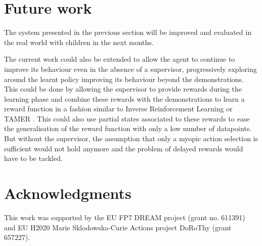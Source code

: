\documentclass[letterpaper]{article} %
\begin{document}
\section{Future work}

The system presented in the previous section will be improved and
evaluated in the real world with children in the next months.

The current work could also be extended to allow the agent to continue to
    improve its behaviour even in the absence of a supervisor, progressively
    exploring around the learnt policy improving its behaviour beyond the
    demonstrations. This could be done by allowing the supervisor to provide
    rewards during the learning phase and combine these rewards with the
    demonstrations to learn a reward function in a fashion similar to Inverse
    Reinforcement Learning \cite{abbeel2004apprenticeship} or TAMER
    \cite{knox2009interactively}. This could also use partial states associated
    to these rewards to ease the generalisation of the reward function with only
    a low number of datapoints.  But without the supervisor, the assumption that
    only a myopic action selection is sufficient would not hold anymore and the
    problem of delayed rewards would have to be tackled.
\section{Acknowledgments} This work was supported by the EU FP7 DREAM project
    (grant no.  611391) and EU H2020 Marie Sklodowska-Curie Actions project
    DoRoThy (grant 657227).  

 
\end{document}
